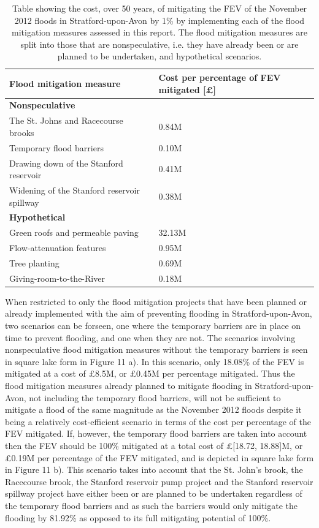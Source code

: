 \documentclass[11pt,a4paper]{article}
\begin{document}
\begin{table}[ht!]
\centering
\begin{tabular}{l|l}
Flood mitigation measure & Cost per percentage of FEV mitigated [\pounds]\\
\hline
\textbf{Nonspeculative} & \\
The St. Johns and Racecourse brooks & 0.84M\\
Temporary flood barriers & 0.10M\\
Drawing down of the Stanford reservoir & 0.41M\\
Widening of the Stanford reservoir spillway & 0.38M\\
\textbf{Hypothetical} & \\
Green roofs and permeable paving& 32.13M\\
Flow-attenuation features & 0.95M\\
Tree planting & 0.69M\\
Giving-room-to-the-River & 0.18M\\
\end{tabular}
\caption{Table showing the cost, over 50 years, of mitigating the FEV of the November 2012 floods in Stratford-upon-Avon by 1\% by implementing each of the flood mitigation measures assessed in this report. The flood mitigation measures are split into those that are nonspeculative, i.e. they have already been or are planned to be undertaken, and hypothetical scenarios.}
\end{table}

\noindent When restricted to only the flood mitigation projects that have been planned or already implemented with the aim of preventing flooding in Stratford-upon-Avon, two scenarios can be forseen, one where the temporary barriers are in place on time to prevent flooding, and one when they are not. The scenarios involving nonspeculative flood mitigation measures without the temporary barriers is seen in square lake form in Figure 11 a). In this scenario, only 18.08\% of the FEV is mitigated at a cost of \pounds8.5M, or \pounds0.45M per percentage mitigated. Thus the flood mitigation measures already planned to mitigate flooding in Stratford-upon-Avon, not including the temporary flood barriers, will not be sufficient to mitigate a flood of the same magnitude as the November 2012 floods despite it being a relatively cost-efficient scenario in terms of the cost per percentage of the FEV mitigated. If, however, the temporary flood barriers are taken into account then the FEV should be 100\% mitigated at a total cost of \pounds[18.72, 18.88]M, or \pounds0.19M per percentage of the FEV mitigated, and is depicted in square lake form in Figure 11 b). This scenario takes into account that the St. John's brook, the Racecourse brook, the Stanford reservoir pump project and the Stanford reservoir spillway project have either been or are planned to be undertaken regardless of the temporary flood barriers and as such the barriers would only mitigate the flooding by 81.92\% as opposed to its full mitigating potential of 100\%.
\end{document}
